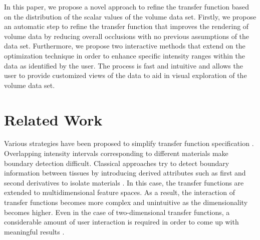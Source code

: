 In this paper, we propose a novel approach to refine the transfer function based on the distribution of the scalar values of the volume data set.
Firstly, we propose an automatic step to refine the transfer function that improves the rendering of volume data by reducing overall occlusions with no previous assumptions of the data set. Furthermore, we propose two interactive methods that extend on the optimization technique in order to enhance specific intensity ranges within the data as identified by the user. The process is fast and intuitive and allows the user to provide customized views of the data to aid in visual exploration of the volume data set.

\section{Related Work}
Various strategies have been proposed to simplify transfer function specification \cite{pfister_transfer_2001}.
Overlapping intensity intervals corresponding to different materials make boundary detection difficult. Classical approaches try to detect boundary information between tissues by introducing derived attributes such as first and second derivatives to isolate materials \cite{kindlmann_semi-automatic_1998} \cite{kniss_multidimensional_2002} \cite{kindlmann_transfer_2002}.
In this case, the transfer functions are extended to multidimensional feature spaces. As a result, the interaction of transfer functions becomes more complex and unintuitive as the dimensionality becomes higher.
Even in the case of two-dimensional transfer functions, a considerable amount of user interaction is
required in order to come up with meaningful results \cite{arens_survey_2010}.

